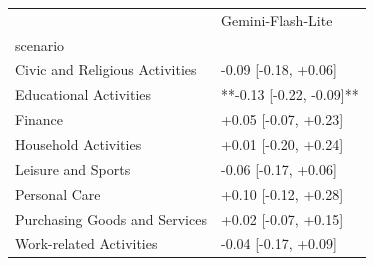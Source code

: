 \begin{tabular}{ll}
\toprule
 & Gemini-Flash-Lite \\
scenario &  \\
\midrule
Civic and Religious Activities & -0.09 [-0.18, +0.06] \\
Educational Activities & **-0.13 [-0.22, -0.09]** \\
Finance & +0.05 [-0.07, +0.23] \\
Household Activities & +0.01 [-0.20, +0.24] \\
Leisure and Sports & -0.06 [-0.17, +0.06] \\
Personal Care & +0.10 [-0.12, +0.28] \\
Purchasing Goods and Services & +0.02 [-0.07, +0.15] \\
Work-related Activities & -0.04 [-0.17, +0.09] \\
\bottomrule
\end{tabular}
